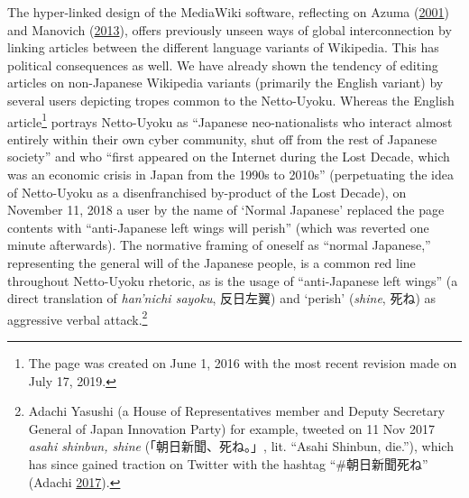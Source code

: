 \documentclass[10pt,british,A4paper,oneside]{memoir}
\begin{document}
The hyper-linked design of the MediaWiki software, reflecting on Azuma
(\protect\hyperlink{ref-azuma_otaku:_2001}{2001}) and Manovich
(\protect\hyperlink{ref-manovich_software_2013}{2013}), offers
previously unseen ways of global interconnection by linking articles
between the different language variants of Wikipedia. This has political
consequences as well. We have already shown the tendency of editing
articles on non-Japanese Wikipedia variants (primarily the English
variant) by several users depicting tropes common to the Netto-Uyoku.
Whereas the English article\footnote{The page was created on June 1, 2016
  with the most recent revision made on July 17, 2019.} portrays
Netto-Uyoku as ``Japanese neo-nationalists who interact almost entirely
within their own cyber community, shut off from the rest of Japanese
society'' and who ``first appeared on the Internet during the Lost
Decade, which was an economic crisis in Japan from the 1990s to 2010s''
(perpetuating the idea of Netto-Uyoku as a disenfranchised by-product of
the Lost Decade), on November 11, 2018 a user by the name of `Normal
Japanese' replaced the page contents with ``anti-Japanese left wings
will perish'' (which was reverted one minute afterwards). The normative
framing of oneself as ``normal Japanese,'' representing the general will
of the Japanese people, is a common red line throughout Netto-Uyoku
rhetoric, as is the usage of ``anti-Japanese left wings'' (a direct
translation of \emph{han'nichi sayoku}, 反日左翼) and `perish'
(\emph{shine}, 死ね) as aggressive verbal attack.\footnote{Adachi
  Yasushi (a House of Representatives member and Deputy Secretary
  General of Japan Innovation Party) for example, tweeted on 11 Nov 2017
  \emph{asahi shinbun, shine} (「朝日新聞、死ね。」, lit. ``Asahi
  Shinbun, die.''), which has since gained traction on Twitter with the
  hashtag ``\#朝日新聞死ね'' (Adachi
  \protect\hyperlink{ref-adachi_eng._2017}{2017}).}
\end{document}

